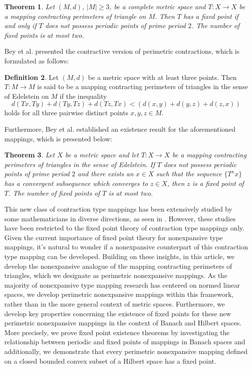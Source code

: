 \documentclass[11pt,reqno]{amsart}
\newtheorem{theorem}{Theorem}[section]
\theoremstyle{definition}
\newtheorem{definition}[theorem]{Definition}
\newtheorem{Open Prob}[theorem]{Open Problem}
\theoremstyle{remark}
\numberwithin{equation}{section}
\begin{document}
\begin{theorem}\cite[\, p. 3, Theorem~2.4]{P23}\label{T12}
Let $(M,d)$, $|M| \geq 3$, be a complete metric space and $T:X\to X$ be a mapping contracting perimeters of triangle on $M$. Then $T$ has a fixed point if and only if $T$ does not possess periodic points of prime period $2$. The number of fixed points is at most two.
\end{theorem}
Bey et al. \cite{BPS25} presented the contractive version of perimetric contractions, which is formulated as follows:


\begin{definition}\cite[\, p. 7, Definition~3.1]{BPS25}\label{D13}
Let $(M,d)$ be a metric space with at least three points. Then  $T: M \to M$ is said to be a mapping contracting perimeters of triangles in the sense of Edelstein on $M$ if the inequality
    \begin{equation}\label{mcpte}
        d(Tx,Ty)+ d(Ty,Tz)+ d(Tz,Tx) < (d(x,y)+ d(y,z)+ d(z,x))
        \end{equation}
        holds for all three pairwise distinct points $x, y, z \in M$.
\end{definition}
Furthermore, Bey et al. established an existence result for the aforementioned mappings, which is presented below:
\begin{theorem}\cite[\, p. 7, Theorem 3.3]{BPS25}\label{T14}
Let $X$ be a metric space and let $T: X \to X$ be a mapping contracting perimeters of triangles in the sense of Edelstein. If $T$ does not possess periodic points of prime period $2$ and there exists an $x \in X$ such that the sequence $\{T^n x\}$ has a convergent subsequence which converges to $z \in X$, then $z$ is a fixed point of $T$. The number of fixed points of $T$ is at most two.
\end{theorem}

This new class of contraction type mappings has been extensively studied by some mathematicians in diverse directions, as seen in \cite{ PB24, PP24,  BMD25, BMD24, P25}. However, these studies have been restricted to the fixed point theory of contraction type mappings only. Given the current importance of fixed point theory for nonexpansive type mappings, it's natural to wonder if a nonexpansive counterpart of this contraction type mapping can be developed. Building on these insights,  in this article, we develop the nonexpansive analogue of the mapping contracting perimeters of triangles, which we designate as perimetric nonexpansive mappings. As the majority of nonexpansive type mapping research has centered on normed linear spaces, we develop perimetric nonexpansive mappings within this framework, rather than in the more general context of metric spaces. Furthermore, we develop key properties concerning the existence of fixed points for these new perimetric nonexpansive mappings in the context of Banach and Hilbert spaces. More precisely, we prove fixed point existence theorems by investigating the relationship between periodic and fixed points of mappings in Banach spaces and additionally, we demonstrate that every perimetric nonexpansive mapping defined on a closed bounded convex subset of a Hilbert space has a fixed point.
\end{document}
